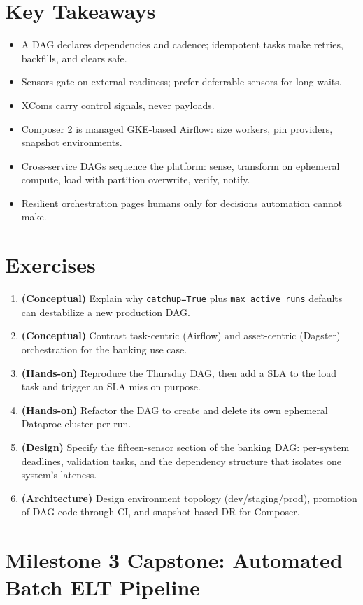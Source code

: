 \section*{Key Takeaways}
\begin{itemize}
    \item A DAG declares dependencies and cadence; idempotent tasks make retries, backfills, and clears safe.
    \item Sensors gate on external readiness; prefer deferrable sensors for long waits.
    \item XComs carry control signals, never payloads.
    \item Composer 2 is managed GKE-based Airflow: size workers, pin providers, snapshot environments.
    \item Cross-service DAGs sequence the platform: sense, transform on ephemeral compute, load with partition overwrite, verify, notify.
    \item Resilient orchestration pages humans only for decisions automation cannot make.
\end{itemize}

\section{Exercises}
\begin{enumerate}
    \item \textbf{(Conceptual)} Explain why \texttt{catchup=True} plus \texttt{max\_active\_runs} defaults can destabilize a new production DAG.
    \item \textbf{(Conceptual)} Contrast task-centric (Airflow) and asset-centric (Dagster) orchestration for the banking use case.
    \item \textbf{(Hands-on)} Reproduce the Thursday DAG, then add a SLA to the load task and trigger an SLA miss on purpose.
    \item \textbf{(Hands-on)} Refactor the DAG to create and delete its own ephemeral Dataproc cluster per run.
    \item \textbf{(Design)} Specify the fifteen-sensor section of the banking DAG: per-system deadlines, validation tasks, and the dependency structure that isolates one system's lateness.
    \item \textbf{(Architecture)} Design environment topology (dev/staging/prod), promotion of DAG code through CI, and snapshot-based DR for Composer.
\end{enumerate}

\section{Milestone 3 Capstone: Automated Batch ELT Pipeline}\label{sec:ch12-capstone}

